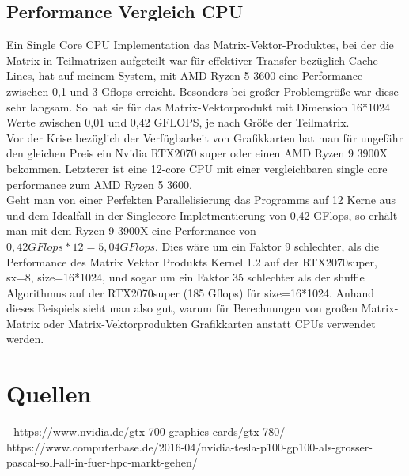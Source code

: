 \documentclass[10pt,a4paper]{article}
\begin{document}
	  \subsection{Performance Vergleich CPU}
	  Ein Single Core CPU Implementation das Matrix-Vektor-Produktes, bei der die Matrix in Teilmatrizen aufgeteilt war für effektiver Transfer bezüglich Cache Lines, hat auf meinem System, mit AMD Ryzen 5 3600 eine Performance zwischen 0,1 und 3 Gflops erreicht. Besonders bei großer Problemgröße war diese sehr langsam. So hat sie für das Matrix-Vektorprodukt mit Dimension 16*1024 Werte zwischen 0,01 und 0,42 GFLOPS, je nach Größe der Teilmatrix.\\ 
	  Vor der Krise bezüglich der Verfügbarkeit von Grafikkarten hat man für ungefähr den gleichen Preis ein Nvidia RTX2070 super oder einen AMD Ryzen 9 3900X bekommen. Letzterer ist eine 12-core CPU mit einer vergleichbaren single core performance zum AMD Ryzen 5 3600. \\
	  Geht man von einer Perfekten Parallelisierung das Programms auf 12 Kerne aus und dem Idealfall in der Singlecore Impletmentierung von 0,42 GFlops, so erhält man mit dem Ryzen 9 3900X eine Performance von $0,42GFlops*12=5,04 GFlops$. Dies wäre um ein Faktor 9 schlechter, als die Performance des Matrix Vektor Produkts Kernel 1.2 auf der RTX2070super, sx=8, size=16*1024, und sogar um ein Faktor 35 schlechter als der shuffle Algorithmus auf der RTX2070super (185 Gflops) für size=16*1024. Anhand dieses Beispiels sieht man also gut, warum für Berechnungen von großen Matrix-Matrix oder Matrix-Vektorprodukten Grafikkarten anstatt CPUs verwendet werden.
	  
	 \section{Quellen} 
	 - https://www.nvidia.de/gtx-700-graphics-cards/gtx-780/
	 -https://www.computerbase.de/2016-04/nvidia-tesla-p100-gp100-als-grosser-pascal-soll-all-in-fuer-hpc-markt-gehen/
\end{document}
